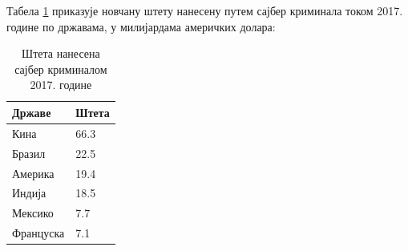 \documentclass[a4paper]{article}
\begin{document}
	Табела \ref{tabela:steta} приказује новчану штету нанесену путем сајбер криминала  током 2017. године по државама, у милијардама америчких долара: 
	\begin{table}[h!]
		\centering
		\caption{Штета нанесена сајбер криминалом 2017. године}
		\vspace*{5mm}
		\label{tabela:steta}
		\begin{tabular}{|l|l|}
			\hline
			Државе & Штета \\ \hline
			Кина & 66.3 \\ \hline
			Бразил & 22.5 \\ \hline
			Америка & 19.4 \\ \hline
			Индија & 18.5 \\ \hline
			Мексико & 7.7 \\ \hline
			Француска & 7.1 \\
			\hline
		\end{tabular}
	\end{table}
\end{document}
